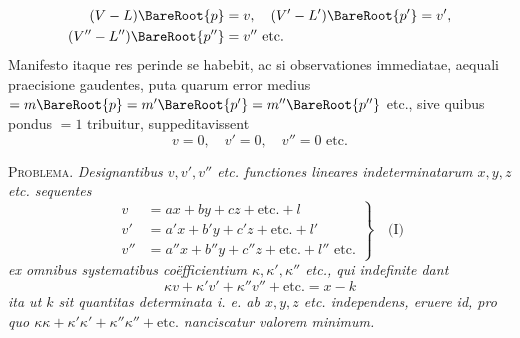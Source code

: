 \[
\begin{aligned}
(V-L)\BareRoot{p}&=v,\quad(V'-L')\BareRoot{p'}=v',\\
(V''-L'')\BareRoot{p''}&=v''\text{ etc.}
\end{aligned}
\]
Manifesto itaque res perinde se habebit, ac si observationes immediatae, aequali praecisione gaudentes, puta quarum error medius \(=m\BareRoot{p}=m'\BareRoot{p'}=m''\BareRoot{p''}\) etc., sive quibus pondus \(=1\) tribuitur, suppeditavissent
\[
v=0,\quad v'=0,\quad v''=0\text{ etc.}
\]

\textsc{Problema.} \textit{Designantibus \(v,v',v''\) etc. functiones lineares indeterminatarum \(x,y,z\) etc. sequentes}
\[
\left.\begin{aligned}
v&=ax+by+cz+\text{etc.}+l\\
v'&=a'x+b'y+c'z+\text{etc.}+l'\\
v''&=a''x+b''y+c''z+\text{etc.}+l''\text{ etc.}
\end{aligned}\right\}\quad\text{(I)}
\]
\textit{ex omnibus systematibus coëfficientium \(\kappa,\kappa',\kappa''\) etc., qui indefinite dant}
\[
\kappa v+\kappa'v'+\kappa''v''+\text{etc.}=x-k
\]
\textit{ita ut \(k\) sit quantitas determinata i. e. ab \(x,y,z\) etc. independens, eruere id, pro quo \(\kappa\kappa+\kappa'\kappa'+\kappa''\kappa''+\text{etc.}\) nanciscatur valorem minimum.}

